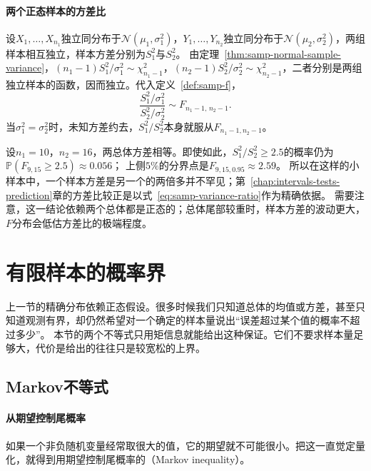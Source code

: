 \paragraph{两个正态样本的方差比}
设$X_1,\dots,X_{n_1}$独立同分布于$\mathcal N(\mu_1,\sigma_1^2)$，$Y_1,\dots,Y_{n_2}$独立同分布于$\mathcal N(\mu_2,\sigma_2^2)$，两组样本相互独立，样本方差分别为$S_1^2$与$S_2^2$。
由定理~\ref{thm:samp-normal-sample-variance}，$(n_1-1)S_1^2/\sigma_1^2\sim\chi^2_{n_1-1}$，$(n_2-1)S_2^2/\sigma_2^2\sim\chi^2_{n_2-1}$，二者分别是两组独立样本的函数，因而独立。代入定义~\ref{def:samp-f}，
\begin{equation}
  \frac{S_1^2/\sigma_1^2}{S_2^2/\sigma_2^2}\sim F_{n_1-1,\,n_2-1}.
  \label{eq:samp-variance-ratio}
\end{equation}
当$\sigma_1^2=\sigma_2^2$时，未知方差约去，$S_1^2/S_2^2$本身就服从$F_{n_1-1,n_2-1}$。

\begin{example}[方差比的波动范围]
\label{ex:samp-variance-ratio}
设$n_1=10$，$n_2=16$，两总体方差相等。即使如此，$S_1^2/S_2^2\geq2.5$的概率仍为$\mathbb{P}(F_{9,15}\geq2.5)\approx0.056$；
上侧$5\%$的分界点是$F_{9,15,0.95}\approx2.59$。
所以在这样的小样本中，一个样本方差是另一个的两倍多并不罕见；第~\ref{chap:intervals-tests-prediction}章的方差比较正是以式~\eqref{eq:samp-variance-ratio}作为精确依据。
需要注意，这一结论依赖两个总体都是正态的；总体尾部较重时，样本方差的波动更大，$F$分布会低估方差比的极端程度。
\end{example}

\section{有限样本的概率界}
\label{sec:samp-bounds}
\label{sec:rv-features}

上一节的精确分布依赖正态假设。很多时候我们只知道总体的均值或方差，甚至只知道观测有界，却仍然希望对一个确定的样本量说出“误差超过某个值的概率不超过多少”。
本节的两个不等式只用矩信息就能给出这种保证。它们不要求样本量足够大，代价是给出的往往只是较宽松的上界。

\subsection{Markov不等式}

\paragraph{从期望控制尾概率}
如果一个非负随机变量经常取很大的值，它的期望就不可能很小。把这一直觉定量化，就得到用期望控制尾概率的（Markov inequality）。


